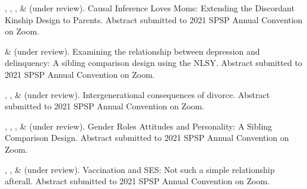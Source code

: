 \item \meb, \emsims, \jt, \& \kl  (under review). Causal Inference Loves Moms: Extending the Discordant Kinship Design to Parents. Abstract submitted to 2021 SPSP Annual Convention on Zoom.
%
\item \emsims\hspace* {2 pt} \& \meb (under review). Examining the relationship between depression and delinquency: A sibling comparison design using the NLSY. Abstract submitted to 2021 SPSP Annual Convention on Zoom.
%
\item \kl, \jt, \& \meb (under review). Intergenerational consequences of divorce. Abstract submitted to 2021 SPSP Annual Convention on Zoom.
%
\item \sherrym, \yrh, \jt, \& \meb (under review). Gender Roles Attitudes and Personality: A Sibling Comparison Design.  Abstract submitted to 2021 SPSP Annual Convention on Zoom.
%
\item \jt, \kl, \& \meb (under review). Vaccination and SES: Not such a simple relationship afterall. Abstract submitted to 2021 SPSP Annual Convention on Zoom.